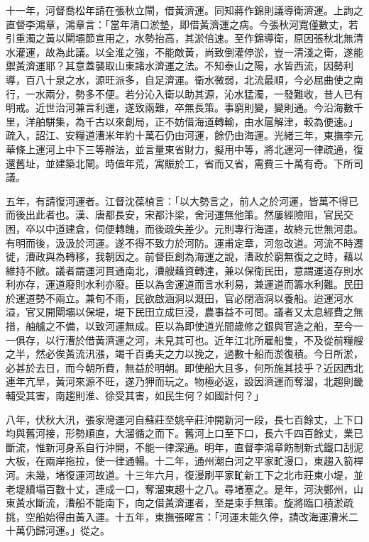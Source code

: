 \begin{pinyinscope}
十一年，河督喬松年請在張秋立閘，借黃濟運。同知蔣作錦則議導衛濟運。上詢之直督李鴻章，鴻章言：「當年清口淤墊，即借黃濟運之病。今張秋河寬僅數丈，若引重濁之黃以閘壩節宣用之，水勢抬高，其淤倍速。至作錦導衛，原因張秋北無清水灌運，故為此議。以全淮之強，不能敵黃，尚致倒灌停淤，豈一清淺之衛，遂能禦黃濟運耶？其意蓋襲取山東諸水濟運之法。不知泰山之陽，水皆西流，因勢利導，百八十泉之水，源旺派多，自足濟運。衛水微弱，北流最順，今必屈曲使之南行，一水兩分，勢多不便。若分沁入衛以助其源，沁水猛濁，一發難收，昔人已有明戒。近世治河兼言利運，遂致兩難，卒無長策。事窮則變，變則通。今沿海數千里，洋舶駢集，為千古以來創局，正不妨借海道轉輸，由水扈解津，較為便速。」疏入，詔江、安糧道漕米年約十萬石仍由河運，餘仍由海運。光緒三年，東撫李元華條上運河上中下三等辦法，並言量東省財力，擬用中等，將北運河一律疏通，復還舊址，並建築北閘。時值年荒，寓賑於工，省而又省，需費三十萬有奇。下所司議。

五年，有請復河運者。江督沈葆楨言：「以大勢言之，前人之於河運，皆萬不得已而後出此者也。漢、唐都長安，宋都汴梁，舍河運無他策。然屢經險阻，官民交困，卒以中道建倉，伺便轉餽，而後疏失差少。元則專行海運，故終元世無河患。有明而後，汲汲於河運。遂不得不致力於河防。運甫定章，河忽改道。河流不時遷徙，漕政與為轉移，我朝因之。前督臣創為海運之說，漕政於窮無復之之時，藉以維持不敝。議者謂運河貫通南北，漕艘藉資轉達，兼以保衛民田，意謂運道存則水利亦存，運道廢則水利亦廢。臣以為舍運道而言水利易，兼運道而籌水利難。民田於運道勢不兩立。兼旬不雨，民欲啟涵洞以溉田，官必閉涵洞以養船。迨運河水溢，官又開閘壩以保堤，堤下民田立成巨浸，農事益不可問。議者又太息經費之無措，舳艫之不備，以致河運無成。臣以為即使道光間歲修之銀與官造之船，至今一一俱存，以行漕於借黃濟運之河，未見其可也。近年江北所雇船隻，不及從前糧艘之半，然必俟黃流汛漲，竭千百勇夫之力以挽之，過數十船而淤復積。今日所淤，必甚於去日，而今朝所費，無益於明朝。即使船大且多，何所施其技乎？近因西北連年亢旱，黃河來源不旺，遂乃狎而玩之。物極必返，設因濟運而奪溜，北趨則畿輔受其害，南趨則淮、徐受其害，如民生何？如國計何？」

八年，伏秋大汛，張家灣運河自蘇莊至姚辛莊沖開新河一段，長七百餘丈，上下口均與舊河接，形勢順直，大溜循之而下。舊河上口至下口，長六千四百餘丈，業已斷流，惟新河身系自行沖開，不能一律深通。明年，直督李鴻章飭制新式鐵口刮泥大板，在兩岸拖拉，使一律通暢。十二年，通州潮白河之平家甿漫口，東趨入箭桿河。未幾，堵復運河故道。十三年六月，復漫刷平家甿新工下之北市莊東小堤，並老堤續塌百數十丈，連成一口，奪溜東趨十之八。尋堵塞之。是年，河決鄭州，山東黃水斷流，漕船不能南下，向之借黃濟運者，至是束手無策。旋將臨口積淤疏挑，空船始得由黃入運。十五年，東撫張曜言：「河運未能久停，請改海運漕米二十萬仍歸河運。」從之。


\end{pinyinscope}
